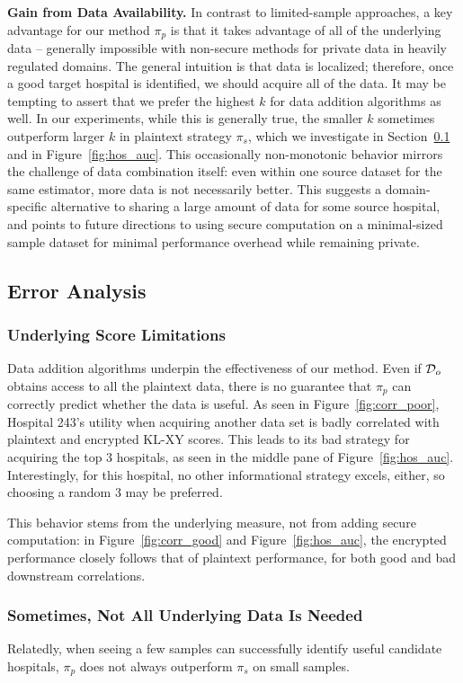\textbf{Gain from Data Availability.}
In contrast to limited-sample approaches, a key advantage for our method $\pi_p$ is that it takes advantage of all of the underlying data -- generally impossible with non-secure methods for private data in heavily regulated domains. The general intuition is that data is localized; therefore, once a good target hospital is identified, we should acquire all of the data. It may be tempting to assert that we prefer the highest $k$ for data addition algorithms as well. In our experiments, while this is generally true, the smaller $k$ sometimes outperform larger $k$ in plaintext strategy $\pi_s$, which we investigate in Section~\ref{sec:limits} and in Figure~\ref{fig:hos_auc}. This occasionally non-monotonic behavior mirrors the challenge of data combination itself: even within one source dataset for the same estimator, more data is not necessarily better. This suggests a domain-specific alternative to sharing a large amount of data for some source hospital, and points to future directions to using secure computation on a minimal-sized sample dataset for minimal performance overhead while remaining private.
\subsection{Error Analysis}
\label{sec:limits}
\subsubsection{Underlying Score Limitations}
Data addition algorithms underpin the effectiveness of our method.
Even if $\mathcal{D}_o$ obtains access to all the plaintext data, there is no guarantee that $\pi_p$ can correctly predict whether the data is useful. As seen in Figure~\ref{fig:corr_poor}, Hospital 243's utility when acquiring another data set is badly correlated with plaintext and encrypted KL-XY scores. This leads to its bad strategy for acquiring the top 3 hospitals, as seen in the middle pane of Figure~\ref{fig:hos_auc}. Interestingly, for this hospital, no other informational strategy excels, either, so choosing a random 3 may be preferred.

This behavior stems from the underlying measure, not from adding secure computation: in Figure~\ref{fig:corr_good} and Figure~\ref{fig:hos_auc}, the encrypted performance closely follows that of plaintext performance, for both good and bad downstream correlations.

\subsubsection{Sometimes, Not All Underlying Data Is Needed}
Relatedly, when seeing a few samples can successfully identify useful candidate hospitals, $\pi_p$ does not always outperform $\pi_s$ on small samples.

